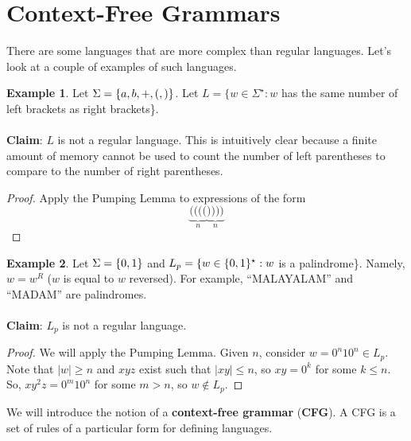 \documentclass[]{article}
\DeclarePairedDelimiter{\set}{\lbrace}{\rbrace}
\theoremstyle{definition}
\newtheorem{ex}{Example}[section]
\newcommand{\lecture}[1]{\marginpar{{\footnotesize $\leftarrow$ \underline{#1}}}}
\begin{document}
  \section{Context-Free Grammars} \lecture{October 15, 2013}
    There are some languages that are more complex than regular languages. Let's look at a couple of examples of such languages.

    \begin{ex}
      Let $\Sigma = \set{a, b, +, (, )}$. Let $L = \{w  \in \Sigma^\star : w $ has the same number of left brackets as right brackets\}.
      \\ \\
      \textbf{Claim}: $L$ is not a regular language. This is intuitively clear because a finite amount of memory cannot be used to count the number of left parentheses to compare to the number of right parentheses.

      \begin{proof}
        Apply the Pumping Lemma to expressions of the form
        $$
          \underbrace{((((}_{n} \underbrace{))))}_{n}
        $$
      \end{proof}
    \end{ex}

    \begin{ex}
      Let $\Sigma = \set{0, 1}$ and $L_p = \{w \in \set{0, 1}^\star : w $ is a palindrome\}. Namely, $w = w^R$ ($w$ is equal to $w$ reversed). For example, ``MALAYALAM'' and ``MADAM'' are palindromes.
      \\ \\
      \textbf{Claim}: $L_p$ is not a regular language.

      \begin{proof}
        We will apply the Pumping Lemma. Given $n$, consider $w = 0^n 1 0^n \in L_p$. Note that $|w| \ge n$ and $xyz$ exist such that $|xy| \le n$, so $xy = 0^k$ for some $k \le n$. So, $xy^2z = 0^m 1 0^n$ for some $m > n$, so $w \not \in L_p$.
      \end{proof}
    \end{ex}

    We will introduce the notion of a \textbf{context-free grammar} (\textbf{CFG}). A CFG is a set of rules of a particular form for defining languages.
\end{document}
